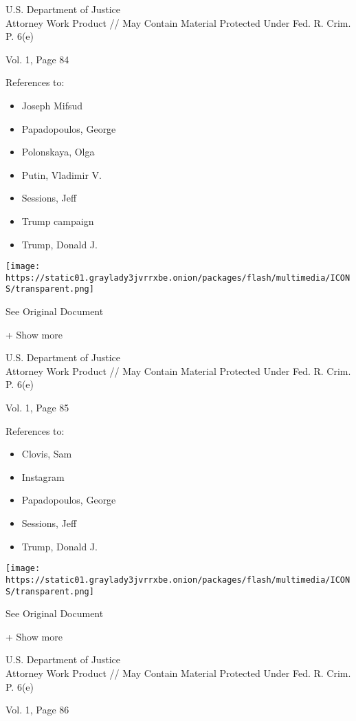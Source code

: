 U.S. Department of Justice\\
Attorney Work Product // May Contain Material Protected Under Fed. R.
Crim. P. 6(e)

Vol. 1, Page 84

References to:

\begin{itemize}
\tightlist
\item
  Joseph Mifsud
\item
  Papadopoulos, George
\item
  Polonskaya, Olga
\item
  Putin, Vladimir V.
\item
  Sessions, Jeff
\item
  Trump campaign
\item
  Trump, Donald J.
\end{itemize}

\protect\hyperlink{}{}

\texttt{[image: https://static01.graylady3jvrrxbe.onion/packages/flash/multimedia/ICONS/transparent.png]}

See Original Document

+ Show more

U.S. Department of Justice\\
Attorney Work Product // May Contain Material Protected Under Fed. R.
Crim. P. 6(e)

Vol. 1, Page 85

References to:

\begin{itemize}
\tightlist
\item
  Clovis, Sam
\item
  Instagram
\item
  Papadopoulos, George
\item
  Sessions, Jeff
\item
  Trump, Donald J.
\end{itemize}

\protect\hyperlink{}{}

\texttt{[image: https://static01.graylady3jvrrxbe.onion/packages/flash/multimedia/ICONS/transparent.png]}

See Original Document

+ Show more

U.S. Department of Justice\\
Attorney Work Product // May Contain Material Protected Under Fed. R.
Crim. P. 6(e)

Vol. 1, Page 86


